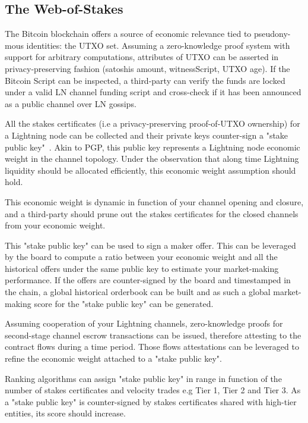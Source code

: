\documentclass[pdflatex,sn-mathphys]{sn-jnl}%
\theoremstyle{thmstyleone}%
\theoremstyle{thmstyletwo}%
\theoremstyle{thmstylethree}%
\begin{document}
\subsection{The Web-of-Stakes}

The Bitcoin blockchain offers a source of economic relevance tied to pseudony- mous identities: the UTXO set. Assuming a zero-knowledge proof system with support for arbitrary computations, attributes of UTXO can be asserted in privacy-preserving fashion (satoshis amount, witnessScript, UTXO age). If the Bitcoin Script can be inspected, a third-party can verify the funds are locked under a valid LN channel funding script and cross-check if it has been announced as a public channel over LN gossips.

All the stakes certificates (i.e a privacy-preserving proof-of-UTXO ownership) for a Lightning node can be collected and their private keys counter-sign a "stake public key"~\cite{Stakes2020Naumenko}. Akin to PGP, this public key represents a Lightning node economic weight in the channel topology. Under the observation that along time Lightning liquidity should be allocated efficiently, this economic weight assumption should hold.

This economic weight is dynamic in function of your channel opening and closure, and a third-party should prune out the stakes certificates for the closed channels from your economic weight. 

This "stake public key" can be used to sign a maker offer. This can be leveraged by the board to compute a ratio between your economic weight and all the historical offers under the same public key to estimate your market-making performance. If the offers are counter-signed by the board and timestamped in the chain, a global historical orderbook can be built and as such a global market-making score for the "stake public key" can be generated.

Assuming cooperation of your Lightning channels, zero-knowledge proofs for second-stage channel escrow transactions can be issued, therefore attesting to the contract flows during a time period. Those flows attestations can be leveraged to refine the economic weight attached to a "stake public key".

Ranking algorithms can assign "stake public key" in range in function of the number of stakes certificates and velocity trades e.g Tier 1, Tier 2 and Tier 3. As a "stake public key" is counter-signed by stakes certificates shared with high-tier entities, its score should increase.
\end{document}
